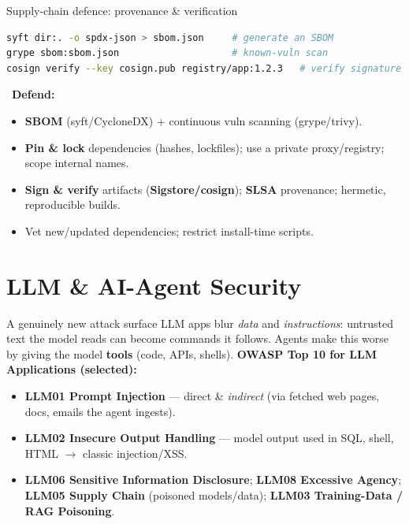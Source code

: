 \documentclass[aspectratio=169,11pt]{beamer}
\newcommand{\defend}[1]{\textcolor{okGreen}{\faLock\ \textbf{Defend:} #1}}
\begin{document}
\begin{frame}[fragile]{Supply-chain defence: provenance \& verification}
  \begin{lstlisting}[language=bash]
syft dir:. -o spdx-json > sbom.json     # generate an SBOM
grype sbom:sbom.json                    # known-vuln scan
cosign verify --key cosign.pub registry/app:1.2.3   # verify signature
  \end{lstlisting}
  \defend{
  \begin{itemize}\footnotesize
    \item \textbf{SBOM} (syft/CycloneDX) + continuous vuln scanning (grype/trivy).
    \item \textbf{Pin \& lock} dependencies (hashes, lockfiles); use a private
          proxy/registry; scope internal names.
    \item \textbf{Sign \& verify} artifacts (\textbf{Sigstore/cosign});
          \textbf{SLSA} provenance; hermetic, reproducible builds.
    \item Vet new/updated dependencies; restrict install-time scripts.
  \end{itemize}}
\end{frame}

\section{LLM \& AI-Agent Security}
\begin{frame}{A genuinely new attack surface}
  LLM apps blur \emph{data} and \emph{instructions}: untrusted text the model
  reads can become commands it follows. Agents make this worse by giving the
  model \textbf{tools} (code, APIs, shells).
  \vspace{0.3em}
  \textbf{OWASP Top 10 for LLM Applications (selected):}
  \begin{itemize}\footnotesize
    \item \textbf{LLM01 Prompt Injection} --- direct \& \emph{indirect} (via
          fetched web pages, docs, emails the agent ingests).
    \item \textbf{LLM02 Insecure Output Handling} --- model output used in SQL,
          shell, HTML $\to$ classic injection/XSS.
    \item \textbf{LLM06 Sensitive Information Disclosure}; \textbf{LLM08
          Excessive Agency}; \textbf{LLM05 Supply Chain} (poisoned models/data);
          \textbf{LLM03 Training-Data / RAG Poisoning}.
  \end{itemize}
\end{frame}
\end{document}

